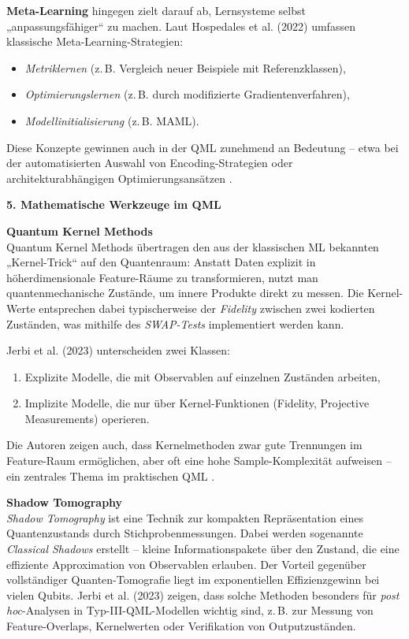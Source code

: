 \vspace{0.2cm}
\noindent
\textbf{Meta-Learning} hingegen zielt darauf ab, Lernsysteme selbst „anpassungsfähiger“ zu machen. Laut Hospedales et al. (2022) umfassen klassische Meta-Learning-Strategien:
\begin{itemize}
  \item \textit{Metriklernen} (z.\,B. Vergleich neuer Beispiele mit Referenzklassen),
  \item \textit{Optimierungslernen} (z.\,B. durch modifizierte Gradientenverfahren),
  \item \textit{Modellinitialisierung} (z.\,B. MAML).
\end{itemize}
Diese Konzepte gewinnen auch in der QML zunehmend an Bedeutung – etwa bei der automatisierten Auswahl von Encoding-Strategien oder architekturabhängigen Optimierungsansätzen \cite{hospedales2022}.  

\vspace{0.4cm}
\noindent\textbf{5. Mathematische Werkzeuge im QML}  

\vspace{0.2cm}
\noindent
\textbf{Quantum Kernel Methods}\\
Quantum Kernel Methods übertragen den aus der klassischen ML bekannten „Kernel-Trick“ auf den Quantenraum: Anstatt Daten explizit in höherdimensionale Feature-Räume zu transformieren, nutzt man quantenmechanische Zustände, um innere Produkte direkt zu messen. Die Kernel-Werte entsprechen dabei typischerweise der \textit{Fidelity} zwischen zwei kodierten Zuständen, was mithilfe des \textit{SWAP-Tests} implementiert werden kann.  

Jerbi et al. (2023) unterscheiden zwei Klassen:
\begin{enumerate}
  \item Explizite Modelle, die mit Observablen auf einzelnen Zuständen arbeiten,
  \item Implizite Modelle, die nur über Kernel-Funktionen (Fidelity, Projective Measurements) operieren.
\end{enumerate}
Die Autoren zeigen auch, dass Kernelmethoden zwar gute Trennungen im Feature-Raum ermöglichen, aber oft eine hohe Sample-Komplexität aufweisen – ein zentrales Thema im praktischen QML \cite{jerbi2023}.

\vspace{0.2cm}
\noindent
\textbf{Shadow Tomography}\\
\textit{Shadow Tomography} ist eine Technik zur kompakten Repräsentation eines Quantenzustands durch Stichprobenmessungen. Dabei werden sogenannte \textit{Classical Shadows} erstellt – kleine Informationspakete über den Zustand, die eine effiziente Approximation von Observablen erlauben. Der Vorteil gegenüber vollständiger Quanten-Tomografie liegt im exponentiellen Effizienzgewinn bei vielen Qubits. Jerbi et al. (2023) zeigen, dass solche Methoden besonders für \textit{post hoc}-Analysen in Typ-III-QML-Modellen wichtig sind, z.\,B. zur Messung von Feature-Overlaps, Kernelwerten oder Verifikation von Outputzuständen.

